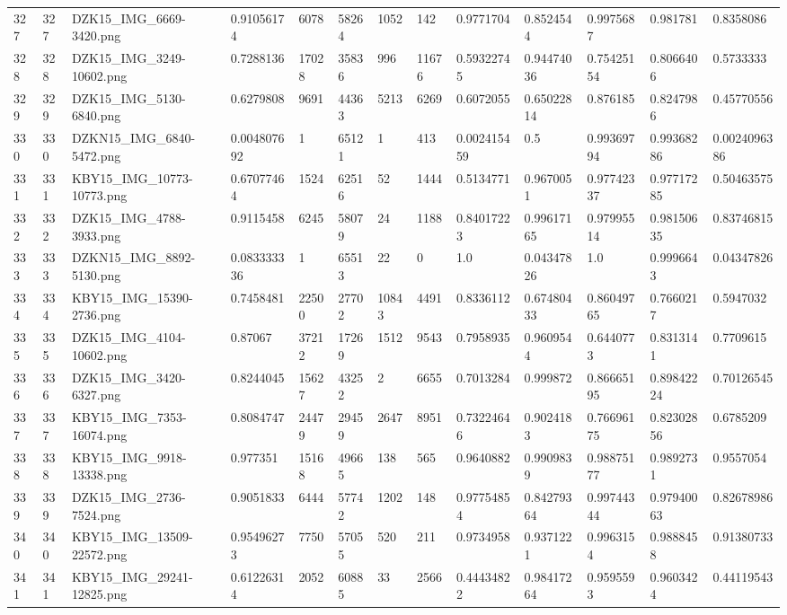 \documentclass[11pt, a4paper, twoside]{report}
\begin{document}
\begin{longtable}[c]{@{}lllllllllllll@{}}
327 & 327 & DZK15\_IMG\_6669-3420.png & 0.91056174 & 6078 & 58264 & 1052 & 142 & 0.9771704 & 0.8524544 & 0.9975687 & 0.981781 & 0.8358086 \\
328 & 328 & DZK15\_IMG\_3249-10602.png & 0.7288136 & 17028 & 35836 & 996 & 11676 & 0.59322745 & 0.94474036 & 0.75425154 & 0.8066406 & 0.5733333 \\
329 & 329 & DZK15\_IMG\_5130-6840.png & 0.6279808 & 9691 & 44363 & 5213 & 6269 & 0.6072055 & 0.65022814 & 0.876185 & 0.8247986 & 0.45770556 \\
330 & 330 & DZKN15\_IMG\_6840-5472.png & 0.004807692 & 1 & 65121 & 1 & 413 & 0.002415459 & 0.5 & 0.99369794 & 0.99368286 & 0.0024096386 \\
331 & 331 & KBY15\_IMG\_10773-10773.png & 0.67077464 & 1524 & 62516 & 52 & 1444 & 0.5134771 & 0.9670051 & 0.97742337 & 0.97717285 & 0.50463575 \\
332 & 332 & DZK15\_IMG\_4788-3933.png & 0.9115458 & 6245 & 58079 & 24 & 1188 & 0.84017223 & 0.99617165 & 0.97995514 & 0.98150635 & 0.83746815 \\
333 & 333 & DZKN15\_IMG\_8892-5130.png & 0.083333336 & 1 & 65513 & 22 & 0 & 1.0 & 0.04347826 & 1.0 & 0.9996643 & 0.04347826 \\
334 & 334 & KBY15\_IMG\_15390-2736.png & 0.7458481 & 22500 & 27702 & 10843 & 4491 & 0.8336112 & 0.67480433 & 0.86049765 & 0.7660217 & 0.5947032 \\
335 & 335 & DZK15\_IMG\_4104-10602.png & 0.87067 & 37212 & 17269 & 1512 & 9543 & 0.7958935 & 0.9609544 & 0.6440773 & 0.8313141 & 0.7709615 \\
336 & 336 & DZK15\_IMG\_3420-6327.png & 0.8244045 & 15627 & 43252 & 2 & 6655 & 0.7013284 & 0.999872 & 0.86665195 & 0.89842224 & 0.70126545 \\
337 & 337 & KBY15\_IMG\_7353-16074.png & 0.8084747 & 24479 & 29459 & 2647 & 8951 & 0.73224646 & 0.9024183 & 0.76696175 & 0.82302856 & 0.6785209 \\
338 & 338 & KBY15\_IMG\_9918-13338.png & 0.977351 & 15168 & 49665 & 138 & 565 & 0.9640882 & 0.9909839 & 0.98875177 & 0.9892731 & 0.9557054 \\
339 & 339 & DZK15\_IMG\_2736-7524.png & 0.9051833 & 6444 & 57742 & 1202 & 148 & 0.97754854 & 0.84279364 & 0.99744344 & 0.97940063 & 0.82678986 \\
340 & 340 & KBY15\_IMG\_13509-22572.png & 0.95496273 & 7750 & 57055 & 520 & 211 & 0.9734958 & 0.9371221 & 0.9963154 & 0.9888458 & 0.91380733 \\
341 & 341 & KBY15\_IMG\_29241-12825.png & 0.61226314 & 2052 & 60885 & 33 & 2566 & 0.44434822 & 0.98417264 & 0.9595593 & 0.9603424 & 0.44119543 \\

\end{longtable}
\end{document}
